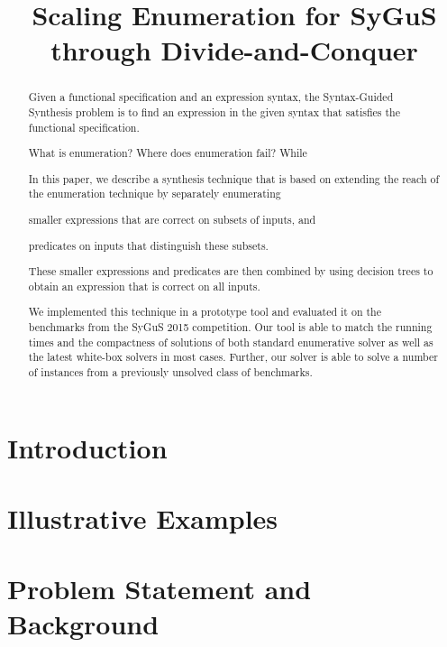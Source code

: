 \documentclass{llncs}
\begin{document}
\title{Scaling Enumeration for SyGuS through Divide-and-Conquer}
\author{}
\institute{}
\maketitle

\vspace{-8ex}
\begin{abstract}
  Given a functional specification and an expression syntax, the
  Syntax-Guided Synthesis problem is to find an expression in the
  given syntax that satisfies the functional specification. 

  What is enumeration?
  Where does enumeration fail?
  While 

  In this paper, we describe a synthesis technique that is based on
  extending the reach of the enumeration technique by separately
  enumerating
  \begin{inparaenum}[(a)]
  \item smaller expressions that are correct on subsets of inputs, and
  \item predicates on inputs that distinguish these subsets.
  \end{inparaenum}
  These smaller expressions and predicates are then combined by using
  decision trees to obtain an expression that is correct on all inputs.

  We implemented this technique in a prototype tool and evaluated it on
  the benchmarks from the SyGuS 2015 competition.
  Our tool is able to match the running times and the compactness of
  solutions of both standard enumerative solver as well as the latest
  white-box solvers in most cases.
  Further, our solver is able to solve a number of instances from
  a previously unsolved class of benchmarks.
\end{abstract}

\section{Introduction}
\label{sec:intro}

\section{Illustrative Examples}
\label{sec:example}

\section{Problem Statement and Background}
\label{sec:problem}
\end{document}
